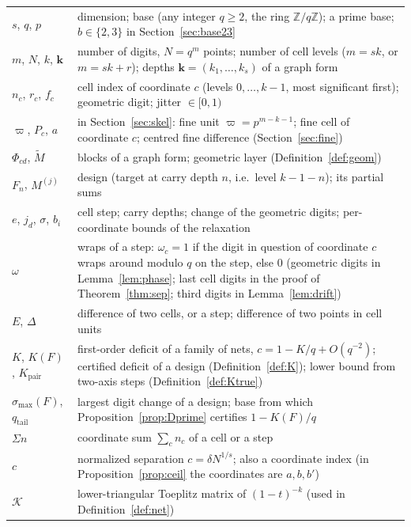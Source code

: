 \documentclass[11pt]{amsart}
\theoremstyle{definition}
\theoremstyle{plain}
\newcommand{\Z}{\mathbb{Z}}
\begin{document}
\begin{table}[tbp]
\centering\footnotesize
\begin{tabular}{@{}l>{\raggedright\arraybackslash}p{11.5cm}@{}}
\toprule
$s$, $q$, $p$ & dimension; base (any integer $q\ge2$, the ring $\Z/q\Z$); a prime base; $b\in\{2,3\}$ in Section~\ref{sec:base23}\\
$m$, $N$, $k$, $\mathbf k$ & number of digits, $N=q^m$ points; number of cell levels ($m=sk$, or $m=sk+r$); depths $\mathbf k=(k_1,\dots,k_s)$ of a graph form\\
$n_c$, $r_c$, $f_c$ & cell index of coordinate $c$ (levels $0,\dots,k-1$, most significant first); geometric digit; jitter $\in[0,1)$\\
$\varpi$, $P_c$, $a$ & in Section~\ref{sec:skel}: fine unit $\varpi=p^{m-k-1}$; fine cell of coordinate $c$; centred fine difference (Section~\ref{sec:fine})\\
$\Phi_{cd}$, $\tilde M$ & blocks of a graph form; geometric layer (Definition~\ref{def:geom})\\
$F_n$, $M^{(j)}$ & design (target at carry depth $n$, i.e.\ level $k-1-n$); its partial sums\\
$e$, $j_d$, $\sigma$, $b_i$ & cell step; carry depths; change of the geometric digits; per-coordinate bounds of the relaxation\\
$\omega$ & wraps of a step: $\omega_c=1$ if the digit in question of coordinate $c$ wraps around modulo $q$ on the step, else $0$ (geometric digits in Lemma~\ref{lem:phase}; last cell digits in the proof of Theorem~\ref{thm:sep}; third digits in Lemma~\ref{lem:drift})\\
$E$, $\Delta$ & difference of two cells, or a step; difference of two points in cell units\\
$K$, $K(F)$, $K_{\mathrm{pair}}$ & first-order deficit of a family of nets, $c=1-K/q+O(q^{-2})$; certified deficit of a design (Definition~\ref{def:K}); lower bound from two-axis steps (Definition~\ref{def:Ktrue})\\
$\sigma_{\max}(F)$, $q_{\mathrm{tail}}$ & largest digit change of a design; base from which Proposition~\ref{prop:Dprime} certifies $1-K(F)/q$\\
$\Sigma n$ & coordinate sum $\sum_cn_c$ of a cell or a step\\
$c$ & normalized separation $c=\delta N^{1/s}$; also a coordinate index (in Proposition~\ref{prop:ceil} the coordinates are $a,b,b'$)\\
$\mathcal K$ & lower-triangular Toeplitz matrix of $(1-t)^{-k}$ (used in Definition~\ref{def:net})\\

\end{tabular}
\end{table}
\end{document}
